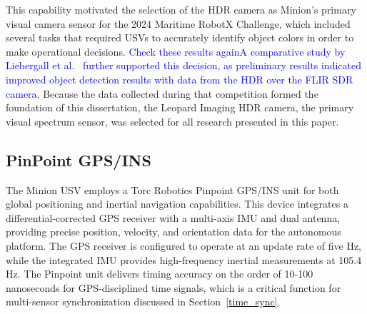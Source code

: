 \documentclass[../main.tex]{subfiles}
\begin{document}
This capability motivated the selection of the \ac{HDR} camera as Minion's primary visual camera sensor for the 2024 Maritime RobotX Challenge, which included several tasks that required \acp{USV} to accurately identify object colors in order to make operational decisions.
\textcolor{blue}{Check these results again}\textcolor{blue}{A comparative study by Liebergall et al.~\cite{liebergall} further supported this decision, as preliminary results indicated improved object detection results with data from the \ac{HDR} over the FLIR \ac{SDR} camera.}
Because the data collected during that competition formed the foundation of this dissertation, the Leopard Imaging \ac{HDR} camera, the primary visual spectrum sensor, was selected for all research presented in this paper.






\subsection{PinPoint GPS/INS} \label{sensors_GPS}


The Minion \ac{USV} employs a Torc Robotics Pinpoint \ac{GPS}/\ac{INS} unit for both global positioning and inertial navigation capabilities.
This device integrates a differential-corrected \ac{GPS} receiver with a multi-axis \ac{IMU} and dual antenna, providing precise position, velocity, and orientation data for the autonomous platform.
The \ac{GPS} receiver is configured to operate at an update rate of five Hz, while the integrated \ac{IMU} provides high-frequency inertial measurements at 105.4 Hz.
The Pinpoint unit delivers timing accuracy on the order of 10-100 nanoseconds for \ac{GPS}-disciplined time signals, which is a critical function for multi-sensor synchronization discussed in Section~\ref{time_sync}.


\end{document}
